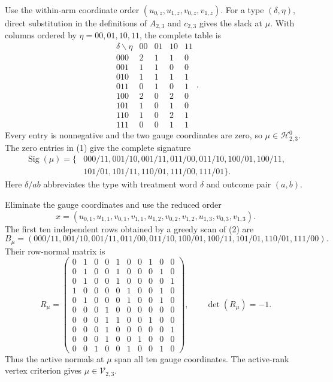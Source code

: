 Use the within-arm coordinate order \((u_{0,z},u_{1,z},v_{0,z},v_{1,z})\). For a type \((\delta,\eta)\), direct substitution in the definitions of \(A_{2,3}\) and \(c_{2,3}\) gives the slack at \(\mu\). With columns ordered by \(\eta=00,01,10,11\), the complete table is
\[\begin{array}{c|rrrr}\delta\backslash\eta&00&01&10&11\\ \hline 000&2&1&1&0\\ 001&1&1&0&0\\ 010&1&1&1&1\\ 011&0&1&0&1\\ 100&2&0&2&0\\ 101&1&0&1&0\\ 110&1&0&2&1\\ 111&0&0&1&1\end{array}.\tag{1}\]
Every entry is nonnegative and the two gauge coordinates are zero, so \(\mu\in\mathcal H^0_{2,3}\). The zero entries in (1) give the complete signature
\[\begin{split}\operatorname{Sig}(\mu)=\{&000/11,001/10,001/11,011/00,011/10,100/01,100/11,\\&101/01,101/11,110/01,111/00,111/01\}.\end{split}\tag{2}\]
Here \(\delta/ab\) abbreviates the type with treatment word \(\delta\) and outcome pair \((a,b)\).

Eliminate the gauge coordinates and use the reduced order
\[x=(u_{0,1},u_{1,1},v_{0,1},v_{1,1},u_{1,2},v_{0,2},v_{1,2},u_{1,3},v_{0,3},v_{1,3}).\]
The first ten independent rows obtained by a greedy scan of (2) are
\[B_\mu=(000/11,001/10,001/11,011/00,011/10,100/01,100/11,101/01,110/01,111/00).\]
Their row-normal matrix is
\[R_\mu=\begin{pmatrix}0&1&0&0&1&0&0&1&0&0\\0&1&0&0&1&0&0&0&1&0\\0&1&0&0&1&0&0&0&0&1\\1&0&0&0&0&1&0&0&1&0\\0&1&0&0&0&1&0&0&1&0\\0&0&0&1&0&0&0&0&0&0\\0&0&0&1&1&0&0&1&0&0\\0&0&0&1&0&0&0&0&0&1\\0&0&0&1&0&0&1&0&0&0\\0&0&1&0&0&1&0&0&1&0\end{pmatrix},\qquad\det(R_\mu)=-1.\tag{3}\]
Thus the active normals at \(\mu\) span all ten gauge coordinates. The active-rank vertex criterion gives \(\mu\in\mathcal V_{2,3}\).

